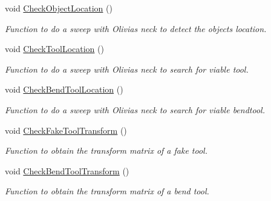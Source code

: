 \begin{DoxyCompactItemize}
\mbox{\label{structManipulate_a6bb3429ac130fad8eb77d50151298367}} 
void \hyperlink{structManipulate_a6bb3429ac130fad8eb77d50151298367}{Check\+Object\+Location} ()
\begin{DoxyCompactList}\small\item\em Function to do a sweep with Olivia\textquotesingle{}s neck to detect the object\textquotesingle{}s location. \end{DoxyCompactList}\item 
\mbox{\label{structManipulate_a3e457a70c1e1f7a5fc374981a41458d8}} 
void \hyperlink{structManipulate_a3e457a70c1e1f7a5fc374981a41458d8}{Check\+Tool\+Location} ()
\begin{DoxyCompactList}\small\item\em Function to do a sweep with Olivia\textquotesingle{}s neck to search for viable tool. \end{DoxyCompactList}\item 
\mbox{\label{structManipulate_aef7247c87eca27ea051a604432db97aa}} 
void \hyperlink{structManipulate_aef7247c87eca27ea051a604432db97aa}{Check\+Bend\+Tool\+Location} ()
\begin{DoxyCompactList}\small\item\em Function to do a sweep with Olivia\textquotesingle{}s neck to search for viable bendtool. \end{DoxyCompactList}\item 
\mbox{\label{structManipulate_a9cfc78219c5a2bac412568c51cb8ac42}} 
void \hyperlink{structManipulate_a9cfc78219c5a2bac412568c51cb8ac42}{Check\+Fake\+Tool\+Transform} ()
\begin{DoxyCompactList}\small\item\em Function to obtain the transform matrix of a fake tool. \end{DoxyCompactList}\item 
\mbox{\label{structManipulate_a27369858402287d0885d8acb960f967e}} 
void \hyperlink{structManipulate_a27369858402287d0885d8acb960f967e}{Check\+Bend\+Tool\+Transform} ()
\begin{DoxyCompactList}\small\item\em Function to obtain the transform matrix of a bend tool. \end{DoxyCompactList}\item 

\end{DoxyCompactItemize}
